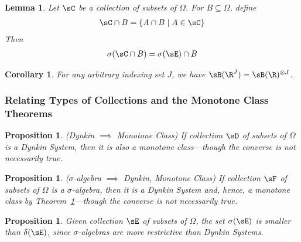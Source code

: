 \documentclass[12pt]{article}
\theoremstyle{plain}
\newtheorem{lem}[thm]{Lemma}
\newtheorem{prop}[thm]{Proposition}
\newtheorem{cor}[thm]{Corollary}
\theoremstyle{definition}
\theoremstyle{remark}
\begin{document}
\begin{lem}
Let $\sC$ be a collection of subsets of $\Omega$. For $B\subseteq
\Omega$, define
\begin{align*}
  \sC \cap B = \{A \cap B \;|\; A \in \sC\}
\end{align*}
Then
\begin{align*}
  \sigma(\sC\cap B) = \sigma(\sE) \cap B
\end{align*}
\end{lem}
\begin{cor}
For any arbitrary indexing set $J$, we have
$\sB(\R^J)=\sB(\R)^{\otimes J}$.
\end{cor}

\clearpage
\subsubsection{Relating Types of Collections and the Monotone Class Theorems}

\begin{prop}\emph{(Dynkin $\implies$ Monotone Class)}
\label{prop:sal-mc}
If collection $\sD$ of subsets of $\Omega$ is a Dynkin System, then
it is also a monotone class---though the converse is not
necessarily true.
\end{prop}

\begin{prop}\emph{($\sigma$-algebra $\implies$ Dynkin, Monotone Class)}
\label{prop:sal-d}
If collection $\sF$ of subsets of $\Omega$ is a $\sigma$-algebra, then
it is a Dynkin System and, hence, a monotone class by
Theorem~\ref{prop:sal-mc}---though the converse is not necessarily true.
\end{prop}

\begin{prop}
Given collection $\sE$ of subsets of $\Omega$, the set $\sigma(\sE)$ is
smaller than $\delta(\sE)$, since $\sigma$-algebras are more
restrictive than Dynkin Systems.
\end{prop}
\end{document}
